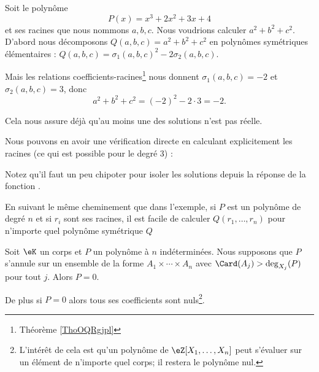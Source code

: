 
\begin{example} \label{ExHIfHhBr}
	Soit le polynôme
	\begin{equation}
		P(x)=x^3+2x^2+3x+4
	\end{equation}
	et ses racines que nous nommons \( a,b,c\). Nous voudrions calculer \( a^2+b^2+c^2\). D'abord nous décomposons \( Q(a,b,c)=a^2+b^2+c^2\) en polynômes symétriques élémentaires : \( Q(a,b,c)=\sigma_1(a,b,c)^2-2\sigma_2(a,b,c)\).

	Mais les relations coefficients-racines\footnote{Théorème \ref{ThoOQRgjpl}} nous donnent \( \sigma_1(a,b,c)=-2\) et \( \sigma_2(a,b,c)=3\), donc
	\begin{equation}
		a^2+b^2+c^2=(-2)^2-2\cdot 3=-2.
	\end{equation}

	Cela nous assure déjà qu'au moins une des solutions n'est pas réelle.

	Nous pouvons en avoir une vérification directe en calculant explicitement les racines (ce qui est possible pour le degré \( 3\)) :
	

	Notez qu'il faut un peu chipoter pour isoler les solutions depuis la réponse de la fonction .
\end{example}

En suivant le même cheminement que dans l'exemple, si \( P\) est un polynôme de degré \( n\) et si \( r_i\) sont ses racines, il est facile de calculer \( Q(r_1,\ldots, r_n)\) pour n'importe quel polynôme symétrique \( Q\)

\begin{proposition} \label{PropTETooGuBYQf}
	Soit \( \eK\) un corps et \( P\) un polynôme à \( n\) indéterminées. Nous supposons que \(P\) s'annule sur un ensemble de la forme \( A_1\times\cdots\times A_n\) avec \( \Card(A_j)>\deg_{X_j}(P)\) pour tout \( j\). Alors \( P=0\).

	De plus si \( P=0\) alors tous ses coefficients sont nuls\footnote{L'intérêt de cela est qu'un polynôme de \( \eZ[X_1,\ldots, X_n]\) peut s'évaluer sur un élément de n'importe quel corps; il restera le polynôme nul.}.
\end{proposition}

